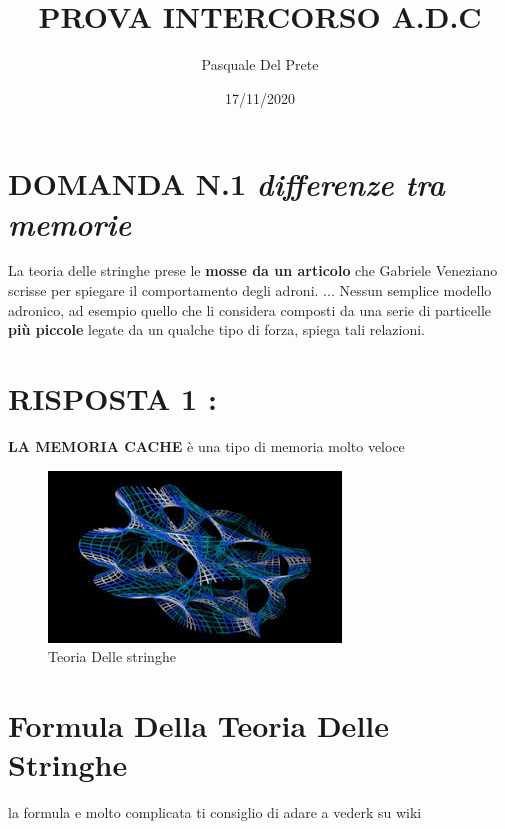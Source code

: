 \documentclass{article}
\title{\textbf{PROVA INTERCORSO A.D.C}}
\author{Pasquale Del Prete}
\date{17/11/2020}
\begin{document}
\maketitle


\section{\textbf{DOMANDA N.1}\textit{ differenze tra memorie}}
La teoria delle stringhe prese le \textbf{mosse da un articolo} che Gabriele Veneziano scrisse per spiegare il comportamento degli adroni. ... Nessun semplice modello adronico, ad esempio quello che li considera composti da una serie di particelle \textbf{più piccole} legate da un qualche tipo di forza, spiega tali relazioni.
\section{\textbf{RISPOSTA 1 : }}
\textbf{LA MEMORIA CACHE} è una tipo di memoria molto veloce
\begin{figure}[h!]
\centering
\includegraphics[scale=1.0]{teoria delle stringhe esempio overleaf.jpg}
\caption{Teoria Delle stringhe}
\label{fig:Teoria Delle Stringhe}
\end{figure}

\section{Formula Della Teoria Delle Stringhe}
la formula e molto complicata ti consiglio di adare a vederk su wiki
\end{document}

